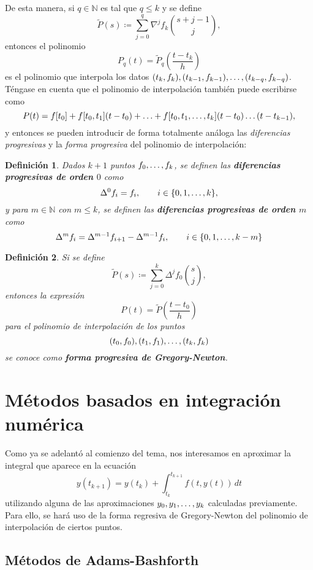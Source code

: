 \documentclass[11pt]{report}
\theoremstyle{mytheorem}
\theoremstyle{mydefinition}
\newtheorem{definition}{Definición}
\theoremstyle{myexample}
\newenvironment{cdefinition} %
  {\begin{mdframed}[
        linewidth=3pt,
        linecolor=c1,
        bottomline=false,
        topline=false,
        rightline=false,
        innerrightmargin=0pt,
        innertopmargin=0pt,
        innerbottommargin=0pt,
        innerleftmargin=1em, %
        skipabove=\baselineskip]
    \begin{definition}}
  {\end{definition}\end{mdframed}}
\newcommand{\N}{\mathbb N}
\newcommand{\mybf}[1]{\boldmath\textbf{\color{c1}#1}\unboldmath}
\begin{document}
De esta manera, si $q \in \N$ es tal que $q \leq k$ y se define
\[\widetilde{P}(s)\coloneqq\sum_{j=0}^q \nabla^jf_k\binom{s+j-1}{j},\]
entonces el polinomio
\[P_q(t)=\widetilde{P}_q\left(\frac{t-t_k}{h}\right)\]
es el polinomio que interpola los datos $(t_k,f_k), (t_{k-1},f_{k-1}), \mathellipsis, (t_{k-q}, f_{k-q})$. Téngase en cuenta que el polinomio de interpolación también puede escribirse como
\[P(t) = f[t_0]+f[t_0,t_1](t-t_0)+\mathellipsis+f[t_0,t_1,\mathellipsis,t_k](t-t_0)\mathellipsis(t-t_{k-1}),\]
y entonces se pueden introducir de forma totalmente análoga las \emph{diferencias progresivas} y la \emph{forma progresiva} del polinomio de interpolación:

\begin{cdefinition}
Dados $k+1$ puntos $f_0,\mathellipsis,f_k$, se definen las \mybf{diferencias progresivas de orden $0$} como
\[\Delta^0f_i = f_i, \qquad i \in \{0,1,\mathellipsis,k\},\]
y para $m \in \N$ con $m \leq k$, se definen las \mybf{diferencias progresivas de orden $m$} como
\[\Delta^mf_i = \Delta^{m-1}f_{i+1}-\Delta^{m-1}f_{i}, \qquad i \in \{0,1,\mathellipsis,k-m\}\]
\end{cdefinition}

\begin{cdefinition}
Si se define
\[\widetilde{P}(s)\coloneqq\sum_{j=0}^k \Delta^jf_0\binom{s}{j},\]
entonces la expresión
\[P(t) = \widetilde{P}\left(\frac{t-t_0}{h}\right)\]
para el polinomio de interpolación de los puntos \[(t_0,f_0),(t_1,f_1),\mathellipsis,(t_k,f_k)\] se conoce como \mybf{forma progresiva de Gregory-Newton}.
\end{cdefinition}

\section{Métodos basados en integración numérica}

Como ya se adelantó al comienzo del tema, nos interesamos en aproximar la integral que aparece en la ecuación 
\[y(t_{k+1}) = y(t_k)+\int_{t_k}^{t_{k+1}}f(t,y(t)) \, dt\]
utilizando alguna de las aproximaciones $y_0,y_1,\mathellipsis,y_k$ calculadas previamente. Para ello, se hará uso de la forma regresiva de Gregory-Newton del polinomio de interpolación de ciertos puntos.

\subsection{Métodos de Adams-Bashforth}
\end{document}
